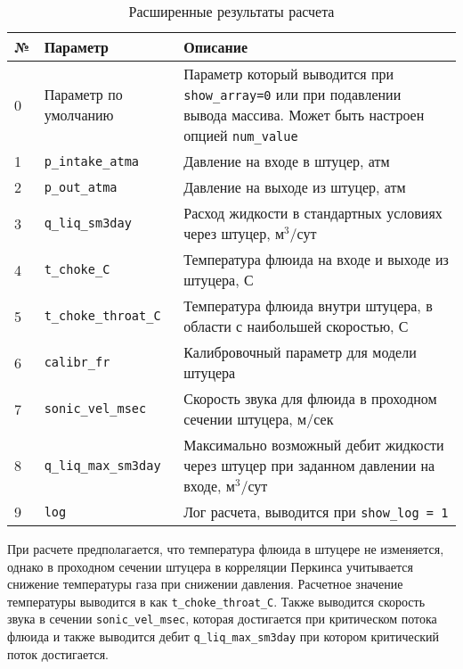 \begin{table}[H]
	\caption{Расширенные результаты расчета}
	\label{table:param_list}
	\begin{tabular}{p{}p{}p{}}
		\hline
		№& Параметр & Описание  \\ \hline
		0 & Параметр по умолчанию & Параметр который выводится при \texttt{show_array=0} или при подавлении вывода массива. Может быть настроен опцией  \texttt{num_value}    \\ \hline
		
		1 & \texttt{p_intake_atma} & Давление на входе в штуцер, атм    \\ \hline
		2 & \texttt{p_out_atma} & Давление на выходе из штуцер, атм    \\ \hline
		3 & \texttt{q_liq_sm3day} & Расход жидкости в стандартных условиях через штуцер, м$^3$/сут    \\ \hline
		4 & \texttt{t_choke_C} & Температура флюида на входе и выходе из штуцера, С  \\ \hline
		5 & \texttt{t_choke_throat_C} & Температура флюида внутри штуцера, в области с наибольшей скоростью, С  \\ \hline
		6 & \texttt{calibr_fr} & Калибровочный параметр для модели штуцера  \\ \hline
		7 & \texttt{sonic_vel_msec} & Скорость звука для флюида в проходном сечении штуцера, м/сек  \\ \hline
		8 & \texttt{q_liq_max_sm3day} & Максимально возможный дебит жидкости через штуцер при заданном давлении на входе, м$^3$/сут  \\ \hline
		9 & \texttt{log} & Лог расчета, выводится при \texttt{show_log = 1}  \\ \hline
		
	\end{tabular}
\end{table}

При расчете предполагается, что температура флюида в штуцере не изменяется, однако в проходном сечении штуцера в корреляции Перкинса учитывается снижение температуры газа при снижении давления. Расчетное значение температуры выводится в как  \texttt{t_choke_throat_C}. Также выводится скорость звука в сечении \texttt{sonic_vel_msec}, которая достигается при критическом потока флюида и также выводится дебит \texttt{q_liq_max_sm3day} при котором критический поток достигается. 



